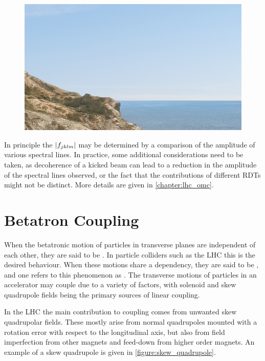 \begin{figure}[!htb]
    \begin{center}
    \includegraphics[width = 0.3\linewidth]{Figures/placeholder.png}
    \caption{}
    \label{figure:example_spectrum}
    \end{center}
\end{figure}

In principle the \(\left\lvert f_{jklm} \right\rvert\) may be determined by a comparison of the amplitude of various spectral lines.
In practice, some additional considerations need to be taken, as decoherence of a kicked beam can lead to a reduction in the amplitude of the spectral lines observed, or the fact that the contributions of different RDTs might not be distinct.
More details are given in \cref{chapter:lhc_omc}.


\section{Betatron Coupling}
\label{section:betatron_coupling}

When the betatronic motion of particles in transverse planes are independent of each other, they are said to be .
In particle colliders such as the LHC this is the desired behaviour.
When these motions share a dependency, they are said to be , and one refers to this phenomenon as .
The transverse motions of particles in an accelerator may couple due to a variety of factors, with solenoid and skew quadrupole fields being the primary sources of linear coupling.

In the LHC the main contribution to coupling comes from unwanted skew quadrupolar fields.
These mostly arise from normal quadrupoles mounted with a rotation error with respect to the longitudinal axis, but also from field imperfection from other magnets and feed-down from higher order magnets.
An example of a skew quadrupole is given in \cref{figure:skew_quadrupole}.

